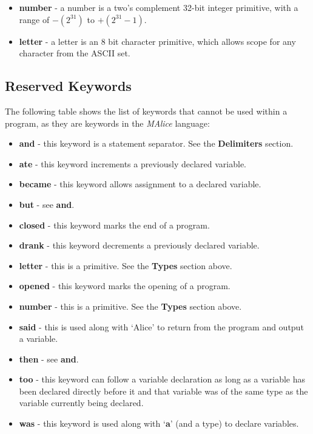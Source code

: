 \documentclass[11pt]{article}
\begin{document}
\begin{itemize}
  \item \textbf{number} - a number is a two's complement 32-bit integer 
  primitive, with a range of \( -(2^{31}) \) to \( +(2^{31} - 1) \). 
  \item \textbf{letter} - a letter is an 8 bit character primitive, which 
  allows scope for any character from the ASCII set.
\end{itemize}

\subsection*{Reserved Keywords}
The following table shows the list of keywords that cannot be used within a program, as they are keywords in the \emph{MAlice} language:

\begin{itemize}
  \item \textbf{and} - this keyword is a statement separator. See the \textbf{Delimiters} section.
  \item \textbf{ate} - this keyword increments a previously declared variable.
  \item \textbf{became} - this keyword allows assignment to a declared variable.
  \item \textbf{but} - see \textbf{and}.
  \item \textbf{closed} - this keyword marks the end of a program.
  \item \textbf{drank} - this keyword decrements a previously declared variable.
  \item \textbf{letter} - this is a primitive. See the \textbf{Types} section above.
  \item \textbf{opened} - this keyword marks the opening of a program.
  \item \textbf{number} - this is a primitive. See the \textbf{Types} section above.
  \item \textbf{said} - this is used along with \textquoteleft Alice\textquoteright{} to return from the program and output a variable.
  \item \textbf{then} - see \textbf{and}.
  \item \textbf{too} - this keyword can follow a variable declaration as long as a variable has been declared directly before it and that variable was of the same type as the variable currently being declared.
  \item \textbf{was} - this keyword is used along with \textquoteleft \textbf{a}\textquoteright{} (and a type) to declare variables.
\end{itemize}
\end{document}

